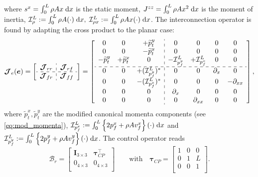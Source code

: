 \documentclass{svjour3}                     %
\begin{document}
where  $s^x = \int_{0}^{L} \rho A x \d{x}$ is the static moment, $J^{zz} = \int_{0}^{L} \rho A x^2 \d{x}$ is the moment of inertia, $\mathcal{I}_\rho^L := \int_{0}^L \rho A (\cdot) \d{x}, \; \mathcal{I}_{\rho x}^L := \int_{0}^L \rho A x (\cdot) \d{x}$. The interconnection operator is found by adapting the cross product to the planar case:
\begin{equation}
\label{eq:EB_J}
\bm{\mathcal{J}}_{e}(\bm{e}) = 
\left[ \begin{array}{c:c}
\bm{\mathcal{J}}_{rr} & \bm{\mathcal{J}}_{rf} \\
\hdashline
\bm{\mathcal{J}}_{fr} & \bm{\mathcal{J}}_{ff} \\
\end{array} \right] = 
\left[ \begin{array}{ccc:cccc}
0 & 0 & +\widetilde{p}_t^y      & 0 & 0 & 0 & 0 \\
0 & 0 & -\widetilde{p}_t^x     & 0 & 0 & 0 & 0 \\
-\widetilde{p}_t^y & +\widetilde{p}_t^x & 0 & -\mathcal{I}_{p_f^y}^{L} & +\mathcal{I}_{p_f^x}^{L} & 0 & 0 \\
\hdashline 
0 & 0 & +(\mathcal{I}_{p_f^y}^{L})^* & 0 & 0 & \partial_x & 0  \\
0 & 0 & -(\mathcal{I}_{p_f^x}^{L})^* & 0 & 0 & 0 & -\partial_{xx} \\
0 & 0 & 0 & \partial_{x} & 0 & 0 & 0 \\
0 & 0 & 0 & 0 & \partial_{xx} & 0 & 0 \\
\end{array} \right],
\end{equation}
where $\widetilde{p}_t^x, \widetilde{p}_t^y$ are the modified canonical momenta components (see \eqref{eq:mod_momenta}), $\mathcal{I}_{p_f^x}^{L} := \int_{0}^{L} \left\{2 p_f^x + \rho A v_f^x \right\} (\cdot) \d{x}$ and $\mathcal{I}_{p_f^y}^{L} := \int_{0}^{L} \left\{2 p_f^y + \rho A v_f^y \right\} (\cdot) \d{x}$. The control operator reads
\begin{equation}
\bm{\mathcal{B}}_r = \begin{bmatrix}
\bm{I}_{3\times 3} & \bm\tau_{CP}^\top \\
0_{4\times 3} & 0_{4\times 3} \\
\end{bmatrix} \qquad \text{with} \quad
\bm\tau_{CP} = \begin{bmatrix}
1 & 0 & 0 \\
0 & 1 & L \\
0 & 0 & 1 \\
\end{bmatrix}.
\end{equation}
\end{document}

